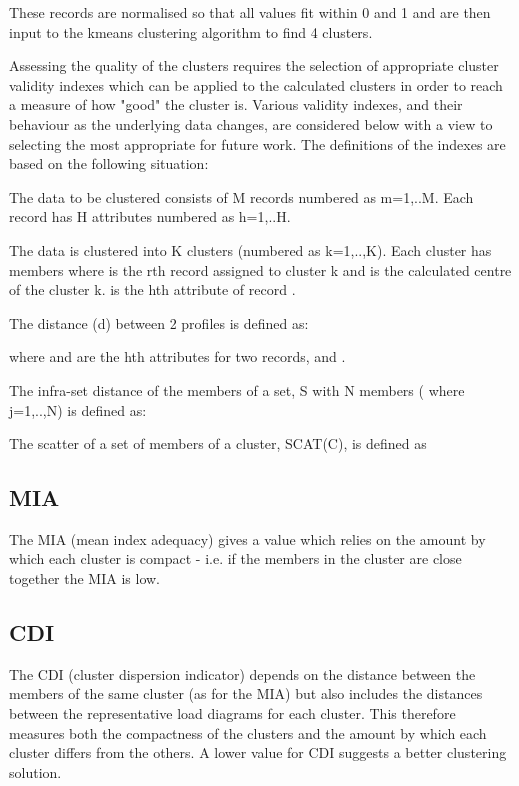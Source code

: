 \documentclass[conference]{IEEEtran}
\begin{document}
These records are normalised so that all values fit within 0 and 1 and are then input to the kmeans clustering algorithm to find 4 clusters.

Assessing the quality of the clusters requires the selection of appropriate cluster validity indexes which can be applied to the calculated clusters in order to reach a measure of how "good" the cluster is. Various validity indexes, and their behaviour as the underlying data changes, are considered below with a view to selecting the most appropriate for future work.
The definitions of the indexes are based on the following situation:

The data to be clustered consists of M records numbered as m=1,..M. Each record has H attributes numbered as h=1,..H.

The data is clustered into K clusters (numbered as k=1,..,K). Each cluster has  members where  is the rth record assigned to cluster k and  is the calculated centre of the cluster k.  is the hth attribute of record .

The distance (d) between 2 profiles is defined as:

where  and  are the hth attributes for two records,  and .

The infra-set distance  of the members of a set, S with N members ( where j=1,..,N) is defined as:


The scatter of a set of members of a cluster, SCAT(C), is defined as


\subsection{MIA}

The MIA (mean index adequacy) \cite{chicco2003customer} gives a value which relies on the amount by which each cluster is compact - i.e. if the members in the cluster are close together the MIA is low. 



\subsection{CDI}

The CDI (cluster dispersion indicator) depends on the distance between the members of the same cluster (as for the MIA) but also includes the distances between the representative load diagrams for each cluster. This therefore measures both the compactness of the clusters and the amount by which each cluster differs from the others. A lower value for CDI suggests a better clustering solution.
\end{document}
